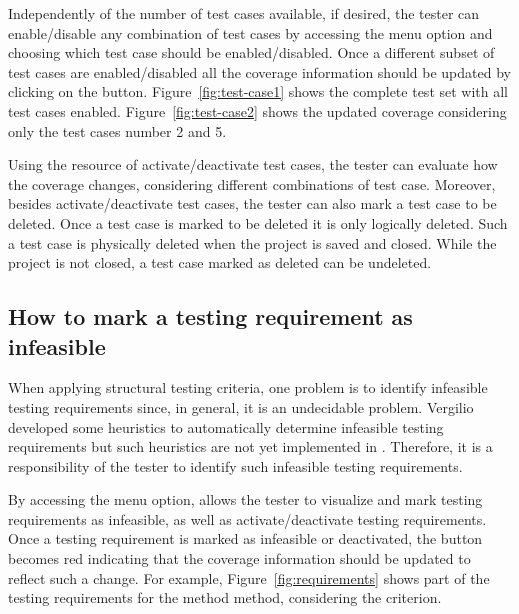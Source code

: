 Independently of the number of test cases available, if desired,
the tester can enable/disable any combination of test cases by
accessing the 
menu option and choosing which test case should be
enabled/disabled. Once a different subset of test cases are
enabled/disabled all the coverage information should be updated by
clicking on the  button. Figure~\ref{fig:test-case1}
shows the complete test set with all test cases enabled.
Figure~\ref{fig:test-case2} shows the updated coverage considering
only the test cases number 2 and 5.



Using the resource of activate/deactivate test cases, the tester
can evaluate how the coverage changes, considering different
combinations of test case. Moreover, besides activate/deactivate
test cases, the tester can also mark a test case to be deleted.
Once a test case is marked to be deleted it is only logically
deleted. Such a test case is physically deleted when the project
is saved and closed. While the project is not closed, a test case
marked as deleted can be undeleted.

\afterpage{\clearpage}
\newpage

\subsection{How to mark a testing requirement as infeasible}

When applying structural testing criteria, one problem is to
identify infeasible testing requirements since, in general, it is
an undecidable problem. Vergilio~\cite{Vergilio97CRCA} developed
some heuristics to automatically determine infeasible testing
requirements but such heuristics are not yet implemented in
\toolname. Therefore, it is a responsibility of the tester to
identify such infeasible testing requirements.

By accessing the  menu option, \toolname allows the tester to visualize
and mark testing requirements as infeasible, as well as
activate/deactivate testing requirements. Once a testing
requirement is marked as infeasible or deactivated, the
 button becomes red indicating that the coverage
information should be updated to reflect such a change. For
example, Figure~\ref{fig:requirements} shows part of the testing
requirements for the method  method,
considering the  criterion.

